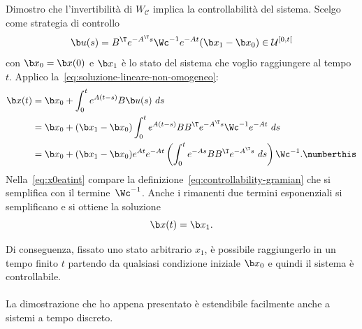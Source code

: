 \begin{steps}
    \item Dimostro che l'invertibilità di $W_{\mathcal C}$ implica la controllabilità del sistema.
    Scelgo come strategia di controllo
    \begin{equation*}
        \b u(s) = B^\T e^{-A^\T s} \Wc^{-1} e^{-At} (\b x_1 - \b x_0) \in \mathcal U^{[0, t[}
    \end{equation*}
    con $\b x_0 = \b x(0)$ e $\b x_1$ è lo stato del sistema che voglio raggiungere al tempo $t$.
    Applico la~\eqref{eq:soluzione-lineare-non-omogeneo}:
    \begin{align*}
        \b x(t) &= \b x_0+ \int_0^t e^{A(t-s)} B \b u(s)\ ds \\
                &= \b x_0 + (\b x_1 - \b x_0) \int_0^t e^{A(t-s)} B B^\T e^{-A^\T s} \Wc^{-1} e^{-At}\ ds \\
                &= \b x_0 + (\b x_1 - \b x_0) e^{At} e^{-At} \left(\int_0^t e^{-As} B B^\T e^{-A^\T s}\ ds \right)\Wc^{-1}. \numberthis \label{eq:x0eatint}
    \end{align*}
    Nella~\eqref{eq:x0eatint} compare la definizione~\eqref{eq:controllability-gramian}
    che si semplifica con il termine~$\Wc^{-1}$.
    Anche i rimanenti due termini esponenziali si semplificano e si ottiene la soluzione
    \begin{equation*}
        \b x(t) = \b x_1.
    \end{equation*}
\end{steps}
Di conseguenza, fissato uno stato arbitrario $x_1$, è possibile raggiungerlo in un tempo finito $t$
partendo da qualsiasi condizione iniziale $\b x_0$ e quindi il sistema è controllabile.

\hfill\qedsymbol \paragraph{}

La dimostrazione che ho appena presentato è estendibile facilmente anche a
sistemi a tempo discreto.

